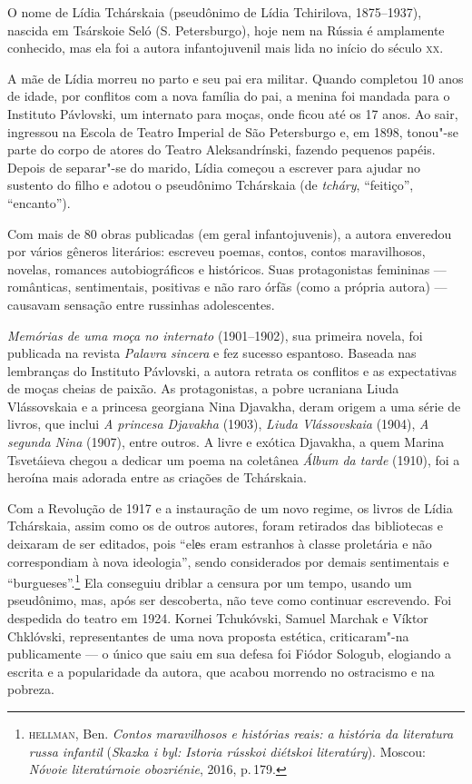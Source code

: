\noindent{}O nome de Lídia Tchárskaia (pseudônimo de Lídia Tchirilova, 1875--1937),
nascida em Tsárskoie Seló (S. Petersburgo), hoje nem na Rússia é
amplamente conhecido, mas ela foi a autora infantojuvenil mais lida no
início do século \textsc{xx}.

A mãe de Lídia morreu no parto e seu pai era militar. Quando completou
10 anos de idade, por conflitos com a nova família do pai, a menina foi
mandada para o Instituto Pávlovski, um internato para moças, onde ficou
até os 17 anos. Ao sair, ingressou na Escola de Teatro Imperial de São
Petersburgo e, em 1898, tonou"-se parte do corpo de atores do Teatro
Aleksandrínski, fazendo pequenos papéis. Depois de separar"-se do marido,
Lídia começou a escrever para ajudar no sustento do filho e adotou o
pseudônimo Tchárskaia (de \emph{tcháry}, ``feitiço'', ``encanto'').

Com mais de 80 obras publicadas (em geral infantojuvenis), a autora
enveredou por vários gêneros literários: escreveu poemas, contos, contos
maravilhosos, novelas, romances autobiográficos e históricos. Suas
protagonistas femininas --- românticas, sentimentais, positivas e não
raro órfãs (como a própria autora) --- causavam sensação entre russinhas
adolescentes.

\emph{Memórias de uma moça no internato} (1901--1902), sua primeira
novela, foi publicada na revista \emph{Palavra sincera} e fez sucesso
espantoso. Baseada nas lembranças do Instituto Pávlovski, a autora
retrata os conflitos e as expectativas de moças cheias de paixão. As
protagonistas, a pobre ucraniana Liuda Vlássovskaia e a princesa
georgiana Nina Djavakha, deram origem a uma série de livros, que inclui
\emph{A princesa Djavakha} (1903), \emph{Liuda Vlássovskaia} (1904),
\emph{A segunda Nina} (1907), entre outros. A livre e exótica Djavakha,
a quem Marina Tsvetáieva chegou a dedicar um poema na coletânea
\emph{Álbum da tarde} (1910), foi a heroína mais adorada entre as
criações de Tchárskaia.

Com a Revolução de 1917 e a instauração de um novo regime, os livros de
Lídia Tchárskaia, assim como os de outros autores, foram retirados das
bibliotecas e deixaram de ser editados, pois ``elеs eram estranhos à
classe proletária e não correspondiam à nova ideologia'', sendo
considerados por demais sentimentais e ``burgueses''.\footnote{\scriptsize\textsc{hellman}, Ben. \textit{Contos maravilhosos e histórias reais: a história da literatura russa infantil} (\textit{Skazka i byl: Istoria rússkoi diétskoi literatúry}). Moscou: \textit{Nóvoie literatúrnoie obozriénie}, 2016, p.\,179.}
Ela conseguiu driblar a censura por um tempo, usando um pseudônimo, mas,
após ser descoberta, não teve como continuar escrevendo. Foi
despedida do teatro em 1924. Kornei Tchukóvski, Samuel Marchak e Víktor
Chklóvski, representantes de uma nova proposta estética, criticaram"-na
publicamente --- o único que saiu em sua defesa foi Fiódor Sologub,
elogiando a escrita e a popularidade da autora, que acabou morrendo no
ostracismo e na pobreza.

